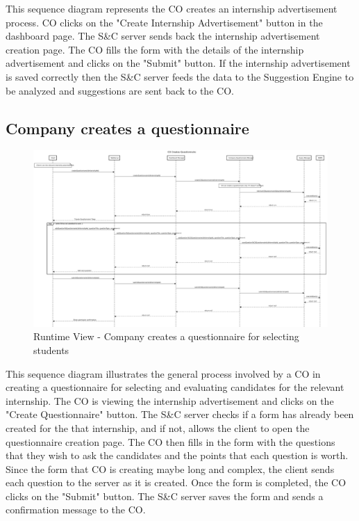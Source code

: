 \par This sequence diagram represents the CO creates an internship advertisement process. CO clicks on the "Create Internship
Advertisement" button in the dashboard page. The S\&C server sends back the internship advertisement creation page. The CO fills
the form with the details of the internship advertisement and clicks on the "Submit" button. If the internship advertisement is
saved correctly then the S\&C server feeds the data to the Suggestion Engine to be analyzed and suggestions are sent back to the CO.

\subsection{Company creates a questionnaire}
\label{sub:company-creates-a-questionnaire}%

\begin{figure}[H]
      \centering
      \includegraphics[width=1.0\textwidth]{Images/RV_07.pdf}
      \caption{Runtime View - Company creates a questionnaire for selecting students}
      \label{fig:rv-co-creates-questionnaire}
\end{figure}

\par This sequence diagram illustrates the general process involved by a CO in creating a questionnaire for selecting
and evaluating candidates for the relevant internship. The CO is viewing the internship advertisement and clicks on the
"Create Questionnaire" button. The S\&C server checks if a form has already been created for the that internship, and
if not, allows the client to open the questionnaire creation page. The CO then fills in the form with the questions
that they wish to ask the candidates and the points that each question is worth. Since the form that CO is creating
maybe long and complex, the client sends each question to the server as it is created. Once the form is completed, the
CO clicks on the "Submit" button. The S\&C server saves the form and sends a confirmation message to the CO.

